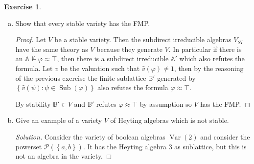 \documentclass{article}
\newcommand{\powset}{\mathcal{P}}
\newcommand{\set}[1]{\left\{#1\right\}}
\newcommand{\setwith}[2]{\set{#1:#2}}
\renewcommand{\qedsymbol}{\raisebox{-0.5cm}{}}
\DeclareMathOperator{\var}{Var}
\DeclareMathOperator{\subform}{Sub}
\newenvironment{solution}{\begin{proof}[Solution]\renewcommand\qedsymbol{}}{\end{proof}}
\theoremstyle{definition}
\newtheorem{question}{Exercise}
\begin{document}
\begin{question}
    \begin{enumerate}[a)]
        \item Show that every stable variety has the FMP.

              \begin{proof}
                  Let \(V\) be a stable variety. Then the subdirect irreducible
                  algebras \(V_{SI}\) have the same theory as \(V\) because they
                  generate \(V\). In particular if there is an
                  \(\mathbb{A}\nvDash\varphi\approx\top\), then there is a
                  subdirect irreducible \(\mathbb{A}'\) which also refutes the
                  formula. Let \(v\) be the valuation such that
                  \(\widehat{v}(\varphi)\neq 1\), then by the reasoning of the
                  previous exercise the finite sublattice \(\mathbb{B}'\)
                  generated by
                  \(\setwith{\widehat{v}(\psi)}{\psi\in\subform(\varphi)}\) also
                  refutes the formula \(\varphi\approx\top\).

                  By stability \(\mathbb{B}'\in V\) and \(\mathbb{B}'\) refutes
                  \(\varphi\approx\top\) by assumption so \(V\) has the FMP.
              \end{proof}

        \item Give an example of a variety \(V\) of Heyting algebras which is
              not stable.

              \begin{solution}
                  Consider the variety of boolean algebras \(\var(2)\) and
                  consider the powerset \(\powset(\set{a,b})\). It has the
                  Heyting algebra \(3\) as sublattice, but this is not an
                  algebra in the variety.
              \end{solution}
    \end{enumerate}
\end{question}
\end{document}
